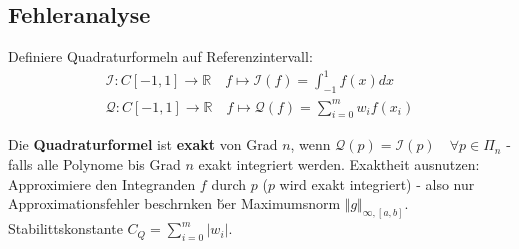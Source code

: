 \subsection{Fehleranalyse}
Definiere Quadraturformeln auf Referenzintervall:
\begin{align*}
\mathcal{I}:C[-1,1]\rightarrow \mathbb{R} \quad f\mapsto \mathcal{I}(f) = \int_{-1}^1 f(x) dx \\
\mathcal{Q}:C[-1,1]\rightarrow \mathbb{R} \quad f \mapsto \mathcal{Q}(f)=\sum_{i=0}^mw_i f(x_i)
\end{align*}

Die \textbf{Quadraturformel} ist \textbf{exakt} von Grad $n$, wenn $\mathcal{Q}(p) = \mathcal{I}(p) \quad \forall p\in \Pi_n$ - falls alle Polynome bis Grad $n$ exakt integriert werden. Exaktheit ausnutzen: Approximiere den Integranden $f$ durch $p$ ($p$ wird exakt integriert) - also nur Approximationsfehler beschr\a nken \u ber Maximumsnorm $\Vert g \Vert_{\infty,[a,b]}$.\\
Stabilit\a tskonstante $C_Q = \sum_{i=0}^m|w_i|$.
